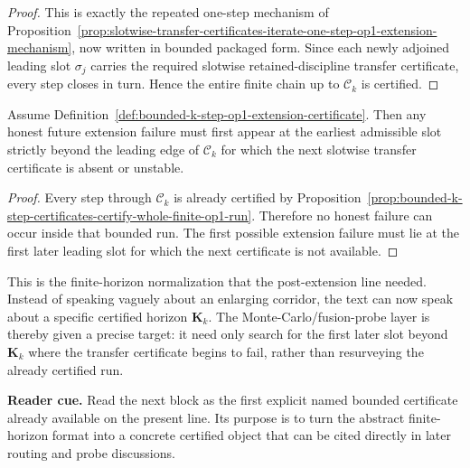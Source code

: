 \begin{proof}
This is exactly the repeated one-step mechanism of Proposition~\ref{prop:slotwise-transfer-certificates-iterate-one-step-op1-extension-mechanism}, now written in bounded packaged form. Since each newly adjoined leading slot $\sigma_j$ carries the required slotwise retained-discipline transfer certificate, every step closes in turn. Hence the entire finite chain up to $\mathcal C_k$ is certified.
\end{proof}

\begin{corollary}
\label{cor:first-honest-failure-lies-beyond-bounded-certificate-horizon}
Assume Definition~\ref{def:bounded-k-step-op1-extension-certificate}. Then any honest future extension failure must first appear at the earliest admissible slot strictly beyond the leading edge of $\mathcal C_k$ for which the next slotwise transfer certificate is absent or unstable.
\end{corollary}

\begin{proof}
Every step through $\mathcal C_k$ is already certified by Proposition~\ref{prop:bounded-k-step-certificates-certify-whole-finite-op1-run}. Therefore no honest failure can occur inside that bounded run. The first possible extension failure must lie at the first later leading slot for which the next certificate is not available.
\end{proof}

\begin{remark}
\label{rem:what-bounded-certificate-format-now-buys}
This is the finite-horizon normalization that the post-extension line needed. Instead of speaking vaguely about an enlarging corridor, the text can now speak about a specific certified horizon $\mathbf K_k$. The Monte-Carlo/fusion-probe layer is thereby given a precise target: it need only search for the first later slot beyond $\mathbf K_k$ where the transfer certificate begins to fail, rather than resurveying the already certified run.
\end{remark}


\noindent\textbf{Reader cue.} Read the next block as the first explicit named bounded certificate already available on the present line. Its purpose is to turn the abstract finite-horizon format into a concrete certified object that can be cited directly in later routing and probe discussions.

